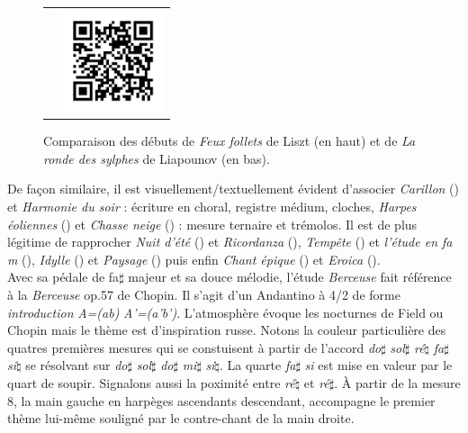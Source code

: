 \begin{figure}[!p]
\begin{bigcenter}
\begin{tabular}{lr}
      &
      \includegraphics[width=3cm, keepaspectratio]{op11-xi-qr.png}
    \end{tabular}
  \end{bigcenter}
  \caption{\label{op11-xi}Comparaison des débuts de \emph{Feux follets} de Liszt (en haut) et de \emph{La ronde des sylphes} de Liapounov (en bas).}
\end{figure}

De façon similaire, il est visuellement/textuellement évident d'associer \emph{Carillon} () et \emph{Harmonie du soir} : écriture en choral, registre médium, cloches, \emph{Harpes éoliennes} () et \emph{Chasse neige} () : mesure ternaire et trémolos. Il est de plus légitime de rapprocher \emph{Nuit d'été} () et \emph{Ricordanza} (), \emph{Tempête} () et \emph{l'étude en fa m} (), \emph{Idylle} () et \emph{Paysage} () puis enfin \emph{Chant épique} () et \emph{Eroica} ().\\

Avec sa pédale de fa$\sharp$ majeur et sa douce mélodie, l'étude \emph{Berceuse}  fait référence à la \emph{Berceuse} op.57 de Chopin. Il s'agit d'un Andantino à 4/2 de forme \emph{introduction} \emph{A=(ab)} \emph{A'=(a'b')}. L’atmosphère évoque les nocturnes de Field ou Chopin mais le thème est d'inspiration russe. Notons la couleur particulière des quatres premières mesures qui se constuisent à partir de l'accord \emph{do}$\sharp$ \emph{sol}$\sharp$ \emph{ré}$\natural$ \emph{fa}$\sharp$ \emph{si}$\natural$ se résolvant sur \emph{do}$\sharp$ \emph{sol}$\sharp$ \emph{do}$\sharp$ \emph{mi}$\sharp$ \emph{si}$\natural$. La quarte \emph{fa}$\sharp$ \emph{si} est mise en valeur par le quart de soupir. Signalons aussi la poximité entre \emph{ré}$\natural$ et \emph{ré}$\sharp$. À partir de la mesure 8, la main gauche en harpèges ascendants descendant, accompagne le premier thème lui-même souligné par le contre-chant de la main droite.

